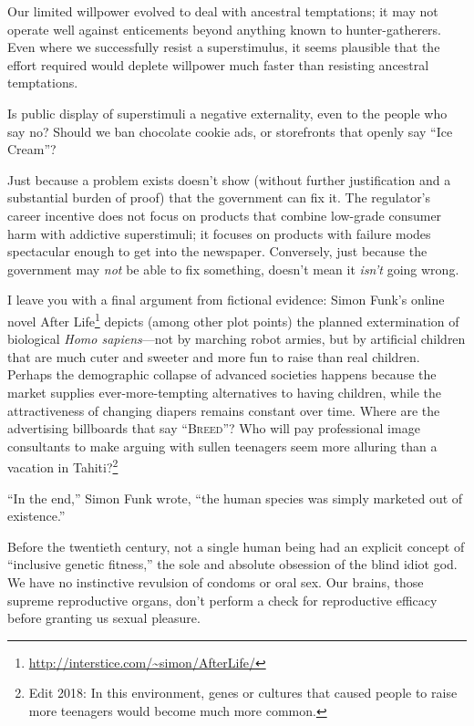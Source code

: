 {{
 Our limited willpower evolved to deal with ancestral temptations;
it may not operate well against enticements beyond anything known to
hunter-gatherers. Even where we successfully resist a superstimulus, it
seems plausible that the effort required would deplete willpower much
faster than resisting ancestral temptations.}

{
 Is public display of superstimuli a negative externality, even to
the people who say no? Should we ban chocolate cookie ads, or
storefronts that openly say ``Ice
Cream''?}

{
 Just because a problem exists doesn't show
(without further justification and a substantial burden of proof) that
the government can fix it. The regulator's career
incentive does not focus on products that combine low-grade consumer
harm with addictive superstimuli; it focuses on products with failure
modes spectacular enough to get into the newspaper. Conversely, just
because the government may \textit{not} be able to fix something,
doesn't mean it \textit{isn't} going
wrong.}

{
 I leave you with a final argument from fictional evidence: Simon
Funk's online novel After Life\footnote{\url{http://interstice.com/~simon/AfterLife/}} depicts (among other
plot points) the planned extermination of biological \textit{Homo
sapiens}{}---not by marching robot armies, but by artificial children
that are much cuter and sweeter and more fun to raise than real
children. Perhaps the demographic collapse of advanced societies
happens because the market supplies ever-more-tempting alternatives to
having children, while the attractiveness of changing diapers remains
constant over time. Where are the advertising billboards that say
``\textsc{Breed}''? Who will pay professional
image consultants to make arguing with sullen teenagers seem more
alluring than a vacation in Tahiti?\footnote{Edit 2018: In this environment, genes or cultures that caused people to raise more teenagers would become much more common.}}

{
 ``In the end,'' Simon Funk
wrote, ``the human species was simply marketed out of
existence.''}

\myendsectiontext


{
 Before the twentieth century, not a single human being had an
explicit concept of ``inclusive genetic
fitness,'' the sole and absolute obsession of the
blind idiot god. We have no instinctive revulsion of condoms or oral
sex. Our brains, those supreme reproductive organs,
don't perform a check for reproductive efficacy before
granting us sexual pleasure. }

}
